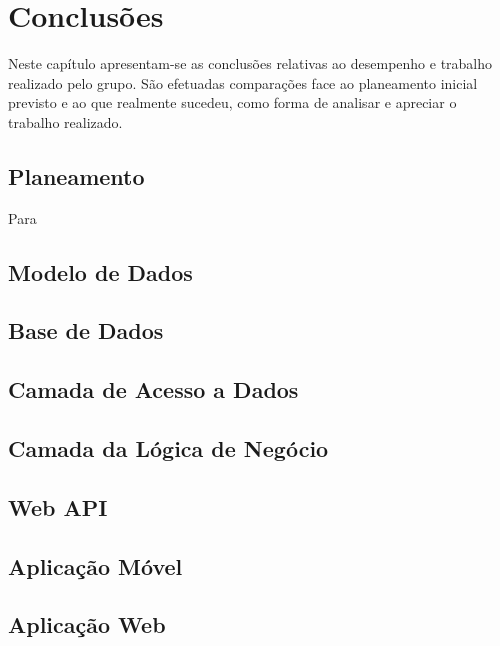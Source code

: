 %
%
\chapter{Conclusões} \label{cap4}

Neste capítulo apresentam-se as conclusões relativas ao desempenho e trabalho realizado pelo grupo. São efetuadas comparações face ao planeamento inicial previsto e ao que realmente sucedeu, como forma de analisar e apreciar o trabalho realizado.

\section{Planeamento}\label{sec41}
Para 

\section{Modelo de Dados}\label{sec42}

\section{Base de Dados}\label{sec43}

\section{Camada de Acesso a Dados}\label{sec44}

\section{Camada da Lógica de Negócio}\label{sec45}

\section{Web API}\label{sec46}

\section{Aplicação Móvel}\label{sec47}

\section{Aplicação Web}\label{sec48}
